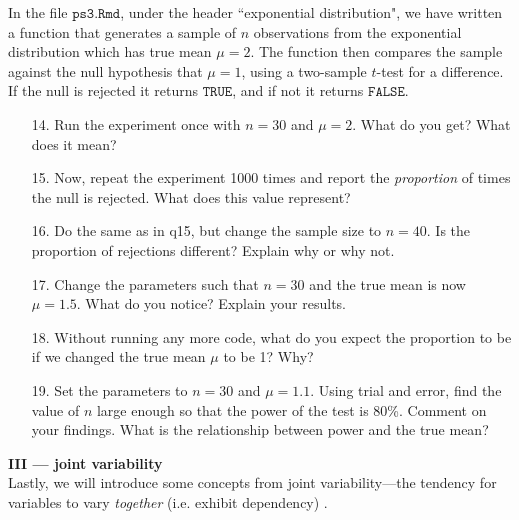 \documentclass[10pt]{extarticle}
\begin{document}
\newpage

In the file $\texttt{ps3.Rmd}$, under the header ``exponential distribution", we have written a function that generates a sample of $n$ observations from the exponential distribution which has true mean $\mu = 2$. The function then compares the sample against the null hypothesis that
$\mu = 1$, using a two-sample $t$-test for a difference. If the null is rejected it returns $\texttt{TRUE}$, and if not it returns $\texttt{FALSE}$.  

\hfill 

\begin{itemize}

	\item[14.] Run the experiment once with $n = 30$ and $\mu = 2$. What do you get? What does it mean? \\ 

	\item[15.] Now, repeat the experiment 1000 times and report the {\it proportion} of times the null is rejected. What does this value represent? \\ 

	\item[16.] Do the same as in q15, but change the sample size to $n = 40$. Is the proportion of rejections different? Explain why or why not. \\ 

	\item[17.] Change the parameters such that $n = 30$ and the true mean is now $\mu = 1.5$. What do you notice? Explain your results. \\ 

	\item[18.] Without running any more code, what do you expect the proportion to be if we changed the true mean $\mu$ to be 1? Why? \\ 

	\item[19.] Set the parameters to $n=30$ and $\mu = 1.1$. Using trial and error, find the value of $n$ large enough so that the power of the test is 80\%. Comment on your findings. What is the relationship between power and the true mean?  

\end{itemize}

\hfill 

{\Large \bf III --- joint variability} \\ 

Lastly, we will introduce some concepts from joint variability---the tendency for variables to vary {\it together} (i.e. exhibit dependency) . \\  
\end{document}
